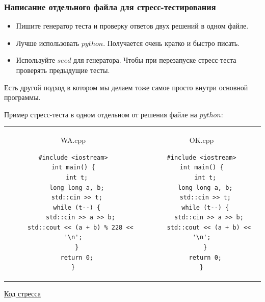 {\subsubsection{Написание отдельного файла для стресс-тестирования}

\up \up
\begin{itemize}
	\item Пишите генератор теста и проверку ответов двух решений в одном файле.
	\item Лучше использовать $python$. Получается очень кратко и быстро писать.
	\item Используйте $seed$ для генератора. Чтобы при перезапуске стресс-теста проверять предыдущие тесты. 
\end{itemize}

Есть другой подход в котором мы делаем тоже самое просто внутри основной программы.

Пример стресс-теста в одном отдельном от решения файле на $python$:

\begin{tabular}{cc}
	\begin{minipage}{9cm}
		WA.cpp
		\begin{verbatim}
#include <iostream>
int main() {
  int t;
  long long a, b;
  std::cin >> t;
  while (t--) {
    std::cin >> a >> b;
    std::cout << (a + b) % 228 << '\n';
  }
  return 0;
}
		\end{verbatim}
	\end{minipage} 
	&
	\begin{minipage}{8cm}
		OK.cpp
		\begin{verbatim}
#include <iostream>
int main() {
  int t;
  long long a, b;
  std::cin >> t;
  while (t--) {
    std::cin >> a >> b;
    std::cout << (a + b) << '\n';
  }
  return 0;
}
		\end{verbatim}
	\end{minipage} 
\end{tabular}

\href{https://pastebin.com/cRGvAuPJ}{Код стресса}

}
